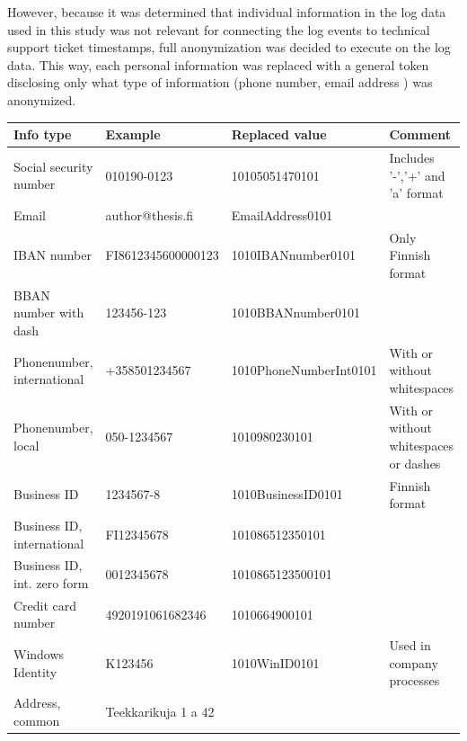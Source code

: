 However,
because it was determined that
individual information in the log data used in this study
was not relevant for connecting the log events to technical support ticket timestamps,
full anonymization was decided to execute on the log data.
This way,
each personal information was replaced with a general token
disclosing only what type of information (phone number, email address \etc) was anonymized.


\begin{table}[]\small
    \tabcolsep=0.11cm
    \begin{tabularx}{\textwidth}{|L{0.17\textwidth}|L{0.27\textwidth}|L{0.30\textwidth}|Y|}
        \hline
        \textbf{Info type} &
        \textbf{Example} &
        \textbf{Replaced value} &
        \textbf{Comment}
        \\ \hline
        Social security number &
        010190-0123 &
        10105051470101 &
        Includes '-','+' and 'a' format
        \\ \hline
        Email &
        author@thesis.fi &
        EmailAddress0101 &
        \\ \hline
        IBAN number &
        FI8612345600000123 &
        1010IBANnumber0101 &
        Only Finnish format
        \\ \hline
        BBAN number with dash &
        123456-123 &
        1010BBANnumber0101 &
        \\ \hline
        Phonenumber, international &
        +358501234567 &
        1010PhoneNumberInt0101 &
        With or without whitespaces
        \\ \hline
        Phonenumber, local &
        050-1234567 &
        1010980230101 &
        With or without whitespaces or dashes
        \\ \hline
        Business ID &
        1234567-8 &
        1010BusinessID0101 &
        Finnish format
        \\ \hline
        Business ID, international &
        FI12345678 &
        101086512350101 &
        \\ \hline
        Business ID, int. zero form &
        0012345678 &
        1010865123500101 &
        \\ \hline
        Credit card number &
        4920191061682346 &
        1010664900101 &
        \\ \hline
        Windows Identity &
        K123456 &
        1010WinID0101 &
        Used in company processes
        \\ \hline
        Address, common &
        Teekkarikuja 1 a 42 &

\end{tabularx}
\end{table}
